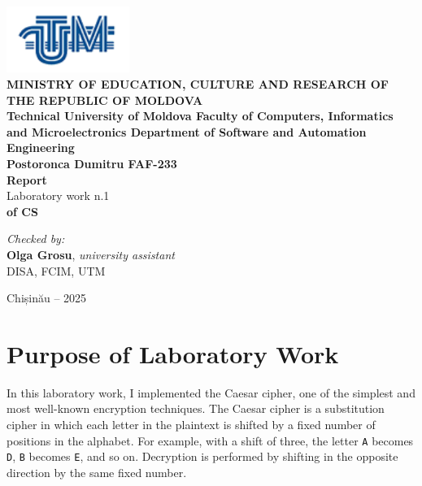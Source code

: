\documentclass[12pt]{article}
\begin{document}
\begin{titlepage}
\begin{center}
    \includegraphics[width=0.3\textwidth]{image.png} \\[0.2cm]
    
    \textbf{MINISTRY OF EDUCATION, CULTURE AND RESEARCH 
OF THE REPUBLIC OF MOLDOVA} \\[0.3cm]
    
    \textbf{Technical University of Moldova 
Faculty of Computers, Informatics and Microelectronics 
Department of Software and Automation Engineering} \\[2cm]
    
    \textbf{Postoronca Dumitru FAF-233}\\[0.5cm]
    
    \Huge \textbf{Report} \\[0.5cm]
    
    \large Laboratory work n.1 \\[0.5cm]
    
    \textbf{of CS} \\[3cm]
    
    \begin{flushright}
        \textit{Checked by:} \\
        \textbf{Olga Grosu}, \textit{university assistant} \\
        DISA, FCIM, UTM
    \end{flushright}
    
    \vfill
    
    Chișinău -- 2025
\end{center}
\end{titlepage}


\newpage
\setcounter{page}{1}
\pagestyle{fancy}
\fancyhf{}
\rhead{\thepage}

\section*{Purpose of Laboratory Work}
\hspace{0.8cm} 

In this laboratory work, I implemented the Caesar cipher, one of the simplest and most well-known 
encryption techniques. The Caesar cipher is a substitution cipher in which each letter in the plaintext 
is shifted by a fixed number of positions in the alphabet. For example, with a shift of three, the letter 
\texttt{A} becomes \texttt{D}, \texttt{B} becomes \texttt{E}, and so on. Decryption is performed by shifting 
in the opposite direction by the same fixed number.
\end{document}
